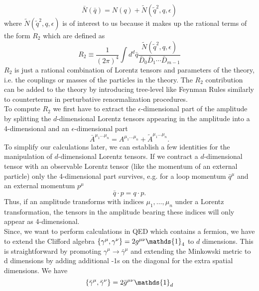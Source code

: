 \begin{equation}
\bar{N}( \bar{q}) = N (q) + \tilde{N} (\tilde{q}^2,q,\epsilon)
\end{equation}
where $\tilde{N} (\tilde{q}^2,q,\epsilon)$ is of interest to us because it makes up the rational terms of the form $R_2$ which are defined as
\begin{equation}
R_2 \equiv \frac{1}{\left( 2\pi \right)^4} \int d^d \bar{q} \frac{\tilde{N} ( \tilde{q}^2,q,\epsilon)}{\bar{D}_0\bar{D}_1\cdots\bar{D}_{m-1}}
\end{equation} 
$R_2$ is just a rational combination of Lorentz tensors and parameters of the theory, i.e. the couplings or masses of the particles in the theory. The $R_2$ contribution can be added to the theory by introducing tree-level like Feynman Rules similarly to counterterms in perturbative renormalization procedures. \\
To compute $R_2$ we first have to extract the $\epsilon$-dimensional part of the amplitude by splitting the $d$-dimensional Lorentz tensors appearing in the amplitude into a 4-dimensional and an $\epsilon$-dimensional part
\begin{equation}
\bar{A}^{\mu_1\dots\mu_n} = A^{\mu_1\dots\mu_n} + \tilde{A}^{\mu_1\dots\mu_n}.
\end{equation}
To simplify our calculations later, we can establish a few identities for the manipulation of $d$-dimensional Lorentz tensors. If we contract a $d$-dimensional tensor with an observable Lorentz tensor (like the momentum of an external particle) only the 4-dimensional part survives, e.g. for a loop momentum $\bar{q}^{\mu}$ and an external momentum $p^{\mu}$
\begin{equation}
\bar{q}\cdot p = q \cdot p.
\end{equation}
Thus, if an amplitude transforms with indices $\mu_1,\dots,\mu_n$ under a Lorentz transformation, the tensors in the amplitude bearing these indices will only appear as 4-dimensional. \\
Since, we want to perform calculations in QED which contains a fermion, we have to extend the Clifford algebra $\lbr \gamma^{\mu},\gamma^{\nu} \rbr = 2g^{\mu\nu} \mathds{1}_4$ to $d$ dimensions. This is straightforward by promoting $\gamma^{\mu} \rightarrow \bar{\gamma}^{\mu}$ and extending the Minkowski metric to d dimensions by adding additional -1s on the diagonal for the extra spatial dimensions. We have
\begin{equation}
\lbr \bar{\gamma}^{\mu},\bar{\gamma}^{\nu} \rbr = 2\bar{g}^{\mu\nu} \mathds{1}_d
\end{equation}
